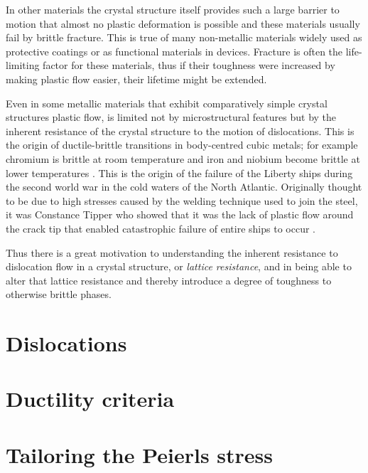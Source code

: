 In other materials the crystal structure itself provides such a large barrier to motion that almost no plastic deformation is possible and these materials usually fail by brittle fracture. This is true of many non-metallic materials widely used as protective coatings or as functional materials in devices. Fracture is often the life-limiting factor for these materials, thus if their toughness were increased by making plastic flow easier, their lifetime might be extended. 

Even in some metallic materials that exhibit comparatively simple crystal structures plastic flow, is limited not by microstructural features but by the inherent resistance of the crystal structure to the motion of dislocations. This is the origin of ductile-brittle transitions in body-centred cubic metals; for example chromium is brittle at room temperature \cite{Harada2004} and iron and niobium become brittle at lower temperatures \cite{Christian1983,Weinberger2013}. This is the origin of the failure of the Liberty ships during the second world war in the cold waters of the North Atlantic. Originally thought to be due to high stresses caused by the welding technique used to join the steel, it was Constance Tipper who showed that it was the lack of plastic flow around the crack tip that enabled catastrophic failure of entire ships to occur \cite{Cottrell1997}. 

Thus there is a great motivation to understanding the inherent resistance to dislocation flow in a crystal structure, or \emph{lattice resistance}, and in being able to alter that lattice resistance and thereby introduce a degree of toughness to otherwise brittle phases.


\section{Dislocations}  
\label{sec:dislocations}



\section{Ductility criteria}
\label{sec:ductility_criteria}





\section{Tailoring the Peierls stress}
\label{sec:tailor_peierls}





